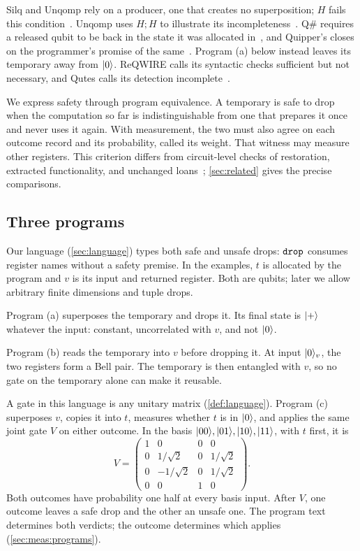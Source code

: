 \documentclass[acmsmall,screen,review,anonymous,nonacm]{acmart}
\begin{document}
Silq and Unqomp rely on a  producer, one that creates no
superposition; $H$ fails this condition~\cite[\S4.1]{Bichsel2020Silq}.
Unqomp uses $H;H$ to illustrate its incompleteness~\cite{Paradis2021Unqomp}. Q\# requires a released qubit to
be back in the state it was allocated
in~\cite{Svore2018Qsharp,MicrosoftQsharpMemory}, and Quipper's
 closes on the programmer's promise of the
same~\cite{Green2013Quipper}. Program (a) below instead leaves its temporary away from $\lvert 0 \rangle$.
ReQWIRE calls its syntactic checks sufficient but not necessary, and
Qutes calls its detection incomplete~\cite{Rand2019ReQWIRE,Faro2026Qutes}.

We express safety through program equivalence. A temporary is safe to drop
when the computation so far is indistinguishable from one that prepares it
once and never uses it again. With measurement, the two must also agree
on each outcome record and its probability, called its weight. That witness may measure other registers. This criterion differs from circuit-level checks of restoration, extracted
functionality, and unchanged loans~\cite{Li2026AncillaSafety,Liu2026Uncomputation,Xu2026Bona};
\cref{sec:related} gives the precise comparisons.

\subsection*{Three programs}

Our language (\cref{sec:language}) types both safe and unsafe drops:
$\texttt{drop}$ consumes register names without a safety premise. In the examples,
$t$ is allocated by the program and $v$ is its input and returned register.
Both are qubits; later we allow arbitrary finite dimensions and tuple drops.

\exRunning

Program (a) superposes the temporary and drops it. Its final state is
$\lvert + \rangle$ whatever the input: constant, uncorrelated with $v$, and not
$\lvert 0 \rangle$.

Program (b) reads the temporary into $v$ before dropping it. At input
$\lvert 0 \rangle_v$, the two registers form a Bell pair. The temporary is then
entangled with $v$, so no gate on the temporary alone can make it reusable.

A gate in this language is any unitary matrix (\cref{def:language}).
Program (c) superposes $v$, copies it into $t$, measures whether $t$ is in
$\lvert 0 \rangle$, and applies the same joint gate $V$ on either outcome. In the
basis $\lvert 00 \rangle,\lvert 01 \rangle,\lvert 10 \rangle,\lvert 11 \rangle$, with $t$ first, it is
\[
 V=\begin{pmatrix}
 1&0&0&0\\
 0&1/\sqrt2&0&1/\sqrt2\\
 0&-1/\sqrt2&0&1/\sqrt2\\
 0&0&1&0
 \end{pmatrix}.
\]
Both outcomes have probability one half at every basis input. After $V$,
one outcome leaves a safe drop and the other an unsafe one. The program
text determines both verdicts; the outcome determines which applies
(\cref{sec:meas:programs}).
\end{document}
